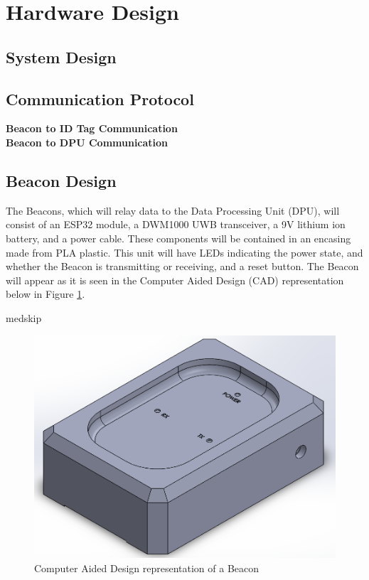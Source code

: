 

\setcounter{section}{3}
\section{Hardware Design}
\bigskip
\subsection{System Design}

\pagebreak
\subsection{Communication Protocol}
\textbf{Beacon to ID Tag Communication}\\
\textbf{Beacon to DPU Communication}


\pagebreak
\subsection{Beacon Design}
The Beacons, which will relay data to the Data Processing Unit (DPU), will consist of an ESP32 module, a DWM1000 UWB transceiver, a 9V lithium ion battery, and a power cable. These components will be contained in an encasing made from PLA plastic. This unit will have LEDs indicating the power state, and whether the Beacon is transmitting or receiving, and a reset button. The Beacon will appear as it is seen in the Computer Aided Design (CAD) representation below in Figure \ref{Bcn_CAD}.

medskip
\begin{figure}[H]
\centering
    \includegraphics[scale=0.55]{./images/Beacon.png}
    \caption{Computer Aided Design representation of a Beacon}
    \label{Bcn_CAD}
\end{figure}

